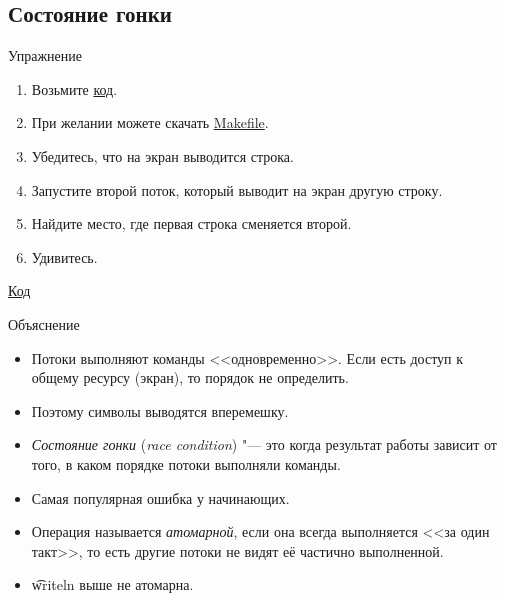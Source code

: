 \subsection{Состояние гонки}

\begin{frame}
\end{frame}

\begin{frame}{Упражнение}
	\begin{enumerate}
		\item Возьмите \href{https://raw.githubusercontent.com/yeputons/spring-2019-paradigms/master/190410/sources/03-writeln-single.cpp}{код}.
		\item При желании можете скачать \href{https://raw.githubusercontent.com/yeputons/spring-2019-paradigms/master/190410/sources/Makefile}{Makefile}.
		\item Убедитесь, что на экран выводится строка.
		\item Запустите второй поток, который выводит на экран другую строку.
		\item Найдите место, где первая строка сменяется второй.
		\item Удивитесь.
	\end{enumerate}
	\href{https://raw.githubusercontent.com/yeputons/spring-2019-paradigms/master/190410/sources/04-writeln-race.cpp}{Код}
\end{frame}

\begin{frame}{Объяснение}
	\begin{itemize}
		\item
			Потоки выполняют команды <<одновременно>>.
			Если есть доступ к общему ресурсу (экран), то порядок не определить.
		\item
			Поэтому символы выводятся вперемешку.
		\item
			\textit{Состояние гонки} (\textit{race condition}) "--- это когда результат работы зависит от того, в каком порядке потоки выполняли команды.
		\item
			Самая популярная ошибка у начинающих.
		\item
			Операция называется \textit{атомарной}, если она всегда выполняется <<за один такт>>,
			то есть другие потоки не видят её частично выполненной.
		\item
			\t{writeln} выше не атомарна.
	\end{itemize}
\end{frame}

